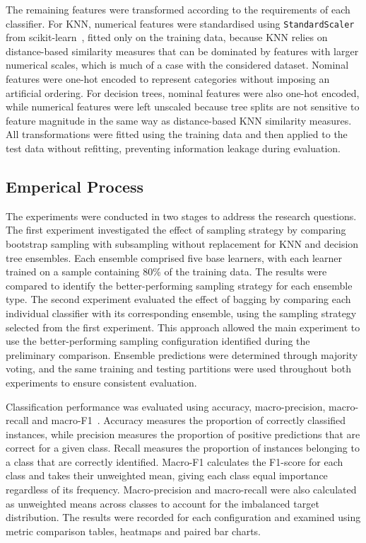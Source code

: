 \documentclass[conference, 10pt]{IEEEtran}
\begin{document}
The remaining features were transformed according to the requirements of each classifier. For KNN, numerical features 
were standardised using \texttt{StandardScaler} from scikit-learn~\cite{pedregosa2011scikit}, fitted only on the training 
data, because KNN relies on distance-based similarity measures that can be dominated by features with larger numerical scales, 
which is much of a case with the considered dataset. Nominal features were one-hot encoded to represent categories without 
imposing an artificial ordering. For decision trees, nominal features were also one-hot encoded, while numerical features 
were left unscaled because tree splits are not sensitive to feature magnitude in the same way as distance-based KNN similarity 
measures. All transformations were fitted using the training data and then applied to the test data without refitting, 
preventing information leakage during evaluation.

\subsection{Emperical Process}
The experiments were conducted in two stages to address the research questions. The first experiment investigated the 
effect of sampling strategy by comparing bootstrap sampling with subsampling without replacement for KNN and decision 
tree ensembles. Each ensemble comprised five base learners, with each learner trained on a sample containing 80\% of the 
training data. The results were compared to identify the better-performing sampling strategy for each ensemble type. 
The second experiment evaluated the effect of bagging by comparing each individual classifier with its corresponding ensemble, 
using the sampling strategy selected from the first experiment. This approach allowed the main experiment to use the 
better-performing sampling configuration identified during the preliminary comparison. Ensemble predictions were determined 
through majority voting, and the same training and testing partitions were used throughout both experiments to ensure consistent 
evaluation.

Classification performance was evaluated using accuracy, macro-precision, macro-recall and macro-F1~\cite{DBLP:journals/ipm/SokolovaL09}. 
Accuracy measures the proportion of correctly classified instances, while precision measures the proportion of 
positive predictions that are correct for a given class. Recall measures the proportion of instances belonging 
to a class that are correctly identified. Macro-F1 calculates the F1-score for each class and takes their 
unweighted mean, giving each class equal importance regardless of its frequency. Macro-precision and macro-recall 
were also calculated as unweighted means across classes to account for the imbalanced target distribution. 
The results were recorded for each configuration and examined using metric comparison tables, heatmaps and 
paired bar charts.
\end{document}
